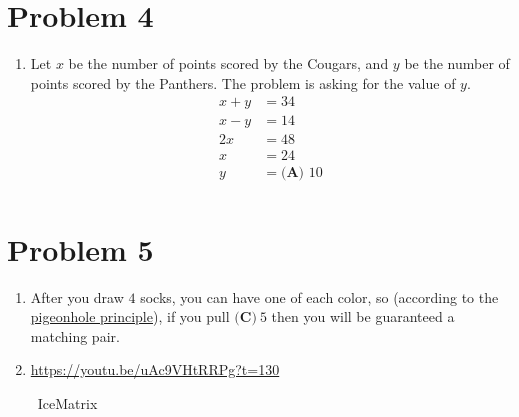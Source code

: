 \documentclass{article}%
\begin{document}
%
\section*{Problem 4}%
\label{sec:Problem4}%
\begin{enumerate}%
\item%
Let $x$ be the number of points scored by the Cougars, and $y$ be the number of points scored by the Panthers. The problem is asking for the value of $y$. 
\begin{align*} x+y &= 34 \\ x-y &= 14 \\ 2x &= 48 \\ x &= 24 \\ y &= \boxed{\textbf{(A) }10} \\ \end{align*}

%
\end{enumerate}

%
\section*{Problem 5}%
\label{sec:Problem5}%
\begin{enumerate}%
\item%
After you draw $4$ socks, you can have one of each color, so (according to the \href{/wiki/index.php/Pigeonhole_principle}{pigeonhole principle}), if you pull $\boxed{\textbf{(C)}\ 5}$ then you will be guaranteed a matching pair.

%
\item%
\href{https://youtu.be/uAc9VHtRRPg?t=130}{https://youtu.be/uAc9VHtRRPg?t=130}

~IceMatrix

%
\end{enumerate}

%
\end{document}
